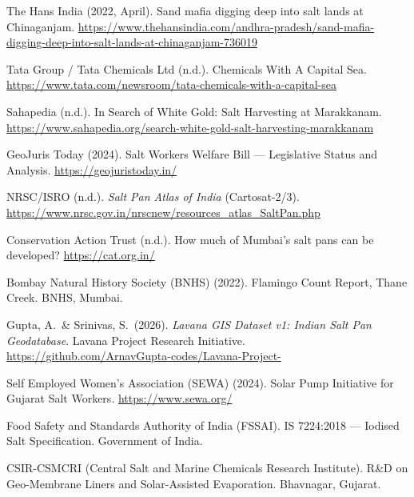 \documentclass[12pt,a4paper]{article}
\begin{document}
\begin{enumerate}[leftmargin=*, label={[\arabic*]}]
  \item The Hans India (2022, April). Sand mafia digging deep into salt lands at
        Chinaganjam.
        \url{https://www.thehansindia.com/andhra-pradesh/sand-mafia-digging-deep-into-salt-lands-at-chinaganjam-736019}

  \item Tata Group / Tata Chemicals Ltd (n.d.). Chemicals With A Capital Sea.
        \url{https://www.tata.com/newsroom/tata-chemicals-with-a-capital-sea}

  \item Sahapedia (n.d.). In Search of White Gold: Salt Harvesting at Marakkanam.
        \url{https://www.sahapedia.org/search-white-gold-salt-harvesting-marakkanam}

  \item GeoJuris Today (2024). Salt Workers Welfare Bill --- Legislative Status and
        Analysis. \url{https://geojuristoday.in/}

  \item NRSC/ISRO (n.d.). \textit{Salt Pan Atlas of India} (Cartosat-2/3).
        \url{https://www.nrsc.gov.in/nrscnew/resources_atlas_SaltPan.php}

  \item Conservation Action Trust (n.d.). How much of Mumbai's salt pans can be
        developed? \url{https://cat.org.in/}

  \item Bombay Natural History Society (BNHS) (2022). Flamingo Count Report, Thane
        Creek. BNHS, Mumbai.

  \item Gupta, A.\ \& Srinivas, S.\ (2026). \textit{Lavana GIS Dataset v1: Indian Salt
        Pan Geodatabase}. Lavana Project Research Initiative.
        \url{https://github.com/ArnavGupta-codes/Lavana-Project-}

  \item Self Employed Women's Association (SEWA) (2024). Solar Pump Initiative for
        Gujarat Salt Workers. \url{https://www.sewa.org/}

  \item Food Safety and Standards Authority of India (FSSAI). IS 7224:2018 ---
        Iodised Salt Specification. Government of India.

  \item CSIR-CSMCRI (Central Salt and Marine Chemicals Research Institute). R\&D on
        Geo-Membrane Liners and Solar-Assisted Evaporation. Bhavnagar, Gujarat.
\end{enumerate}
\end{document}
